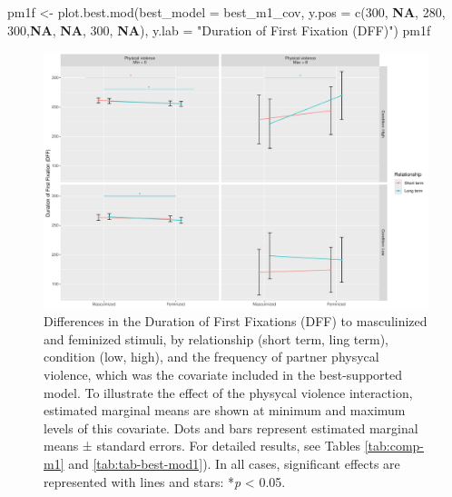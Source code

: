 \documentclass[
  bookmarksnumbered]{article}
\newenvironment{Shaded}{\begin{snugshade}}{\end{snugshade}}
\newcommand{\AttributeTok}[1]{\textcolor[rgb]{0.80,0.80,0.80}{#1}}
\newcommand{\ConstantTok}[1]{\textcolor[rgb]{0.86,0.64,0.64}{\textbf{#1}}}
\newcommand{\DecValTok}[1]{\textcolor[rgb]{0.86,0.86,0.80}{#1}}
\newcommand{\FunctionTok}[1]{\textcolor[rgb]{0.94,0.94,0.56}{#1}}
\newcommand{\NormalTok}[1]{\textcolor[rgb]{0.80,0.80,0.80}{#1}}
\newcommand{\OtherTok}[1]{\textcolor[rgb]{0.94,0.94,0.56}{#1}}
\newcommand{\StringTok}[1]{\textcolor[rgb]{0.80,0.58,0.58}{#1}}
\begin{document}
\begin{Shaded}
\begin{Highlighting}[]
\NormalTok{pm1f }\OtherTok{\textless{}{-}} \FunctionTok{plot.best.mod}\NormalTok{(}\AttributeTok{best\_model =}\NormalTok{ best\_m1\_cov, }
                      \AttributeTok{y.pos =} \FunctionTok{c}\NormalTok{(}\DecValTok{300}\NormalTok{, }\ConstantTok{NA}\NormalTok{, }\DecValTok{280}\NormalTok{, }\DecValTok{300}\NormalTok{,}\ConstantTok{NA}\NormalTok{, }\ConstantTok{NA}\NormalTok{, }\DecValTok{300}\NormalTok{, }\ConstantTok{NA}\NormalTok{),}
                      \AttributeTok{y.lab =} \StringTok{"Duration of First Fixation (DFF)"}\NormalTok{)}
\NormalTok{pm1f}
\end{Highlighting}
\end{Shaded}

\begin{figure}
\centering
\includegraphics{Supplementary_material_files/figure-latex/fig-mod1-cov-1.pdf}
\caption{\label{fig:fig-mod1-cov}Differences in the Duration of First Fixations (DFF) to masculinized and feminized stimuli, by relationship (short term, ling term), condition (low, high), and the frequency of partner physycal violence, which was the covariate included in the best-supported model. To illustrate the effect of the physycal violence interaction, estimated marginal means are shown at minimum and maximum levels of this covariate. Dots and bars represent estimated marginal means ± standard errors. For detailed results, see Tables \ref{tab:comp-m1} and \ref{tab:tab-best-mod1}). In all cases, significant effects are represented with lines and stars: *\emph{p} \textless{} 0.05.}
\end{figure}
\end{document}
